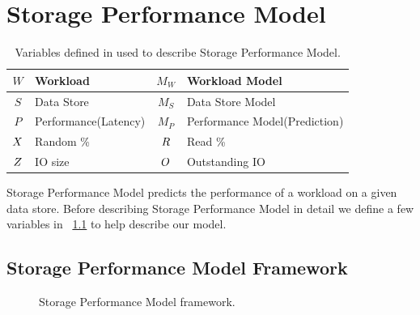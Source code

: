 \chapter{Storage Performance Model}
\label{SPM}

\begin{table}[!t]
\centering
\begin{tabularx}{0.9\textwidth}{c|X||c|X}
\hline
$W$     & Workload                      & $M_W$   & Workload Model \\ \hline
$S$     & Data Store                    & $M_S$   & Data Store Model \\ \hline
$P$     & Performance(Latency)          & $M_P$   & Performance Model(Prediction) \\ \hline
$X$ & Random \%                     & $R$ & Read \% \\ \hline
$Z$ & IO size                       & $O$  & Outstanding IO \\ \hline
\end{tabularx}
\captionsetup{format=myformat}
\caption{Variables defined in used to describe Storage Performance Model.}
\label{terminology}
\end{table}

Storage Performance Model predicts the performance of a workload on a given data store. 
Before describing Storage Performance Model in detail we define a few variables in \tablename~\ref{terminology} to help describe our model.

\section{Storage Performance Model Framework}

\begin{figure}[!t]
\centering

\captionsetup{format=myformat}
\caption{Storage Performance Model framework.}
\label{rpm}
\end{figure}

